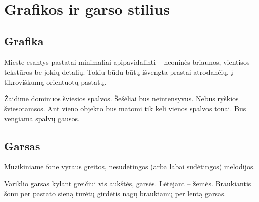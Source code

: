 \section{Grafikos ir garso stilius}
\subsection{Grafika}

Mieste esantys pastatai minimaliai apipavidalinti -- neoninės briaunos, vientisos tekstūros be jokių detalių.
Tokiu būdu būtų išvengta prastai atrodančių, į tikroviškumą orientuotų pastatų.

Žaidime dominuos šviesios spalvos.
Šešėliai bus neintensyvūs.
Nebus ryškios šviesotamsos.
Ant vieno objekto bus matomi tik keli vienos spalvos tonai.
Bus vengiama spalvų gausos.

\subsection{Garsas}

Muzikiniame fone vyraus greitos, nesudėtingos (arba labai sudėtingos) melodijos.

Variklio garsas kylant greičiui vis aukštės, garsės. Lėtėjant -- žemės.
Braukiantis šonu per pastato sieną turėtų girdėtis nagų braukiamų per lentą garsas.
